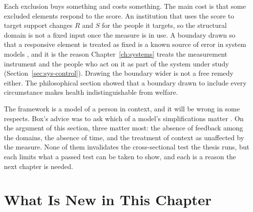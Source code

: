 Each exclusion buys something and costs something. The main cost is that some excluded elements respond to the score. An institution that uses the score to target support changes $R$ and $S$ for the people it targets, so the structural domain is not a fixed input once the measure is in use. A boundary drawn so that a responsive element is treated as fixed is a known source of error in system models \citep{sterman_2000}, and it is the reason Chapter~\ref{ch:systems} treats the measurement instrument and the people who act on it as part of the system under study (Section~\ref{sec:sys-control}). Drawing the boundary wider is not a free remedy either. The philosophical section showed that a boundary drawn to include every circumstance makes health indistinguishable from welfare.

The framework is a model of a person in context, and it will be wrong in some respects. Box's advice was to ask which of a model's simplifications matter \citep{box_1976}. On the argument of this section, three matter most: the absence of feedback among the domains, the absence of time, and the treatment of context as unaffected by the measure. None of them invalidates the cross-sectional test the thesis runs, but each limits what a passed test can be taken to show, and each is a reason the next chapter is needed.

\section*{What Is New in This Chapter}


